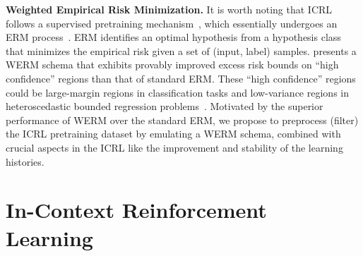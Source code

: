 \documentclass{article}
\begin{document}
\textbf{Weighted Empirical Risk Minimization.}
%
It is worth noting that ICRL follows a supervised pretraining mechanism~\cite{chen2025random}, which essentially undergoes an ERM process~\cite{bartlett2005local, massart2006risk}.
%
ERM identifies an optimal hypothesis from a hypothesis class that minimizes the empirical risk given a set of (input, label) samples. \cite{zhang2025reweighting} presents a WERM schema that exhibits provably improved excess risk bounds on ``high confidence'' regions than that of standard ERM. These ``high confidence'' regions could be large-margin regions in classification tasks and low-variance regions in heteroscedastic bounded regression problems~\cite{zhang2025reweighting}. Motivated by the superior performance of WERM over the standard ERM, we propose to preprocess (filter) the ICRL pretraining dataset by emulating a WERM schema, combined with crucial aspects in the ICRL like the improvement and stability of the learning histories.







\section{In-Context Reinforcement Learning}
\label{section_preliminary}




\end{document}
